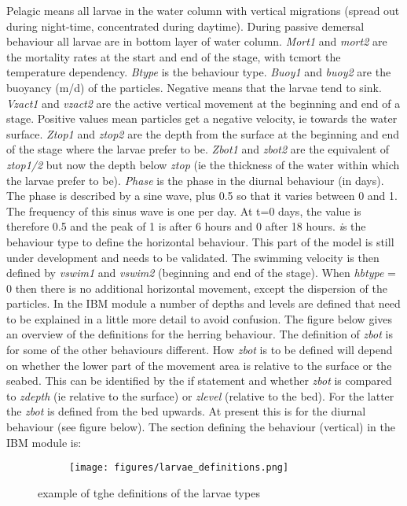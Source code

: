 \documentclass[english]{deltares_manual}
\begin{document}
Pelagic means all larvae in the water column with vertical migrations (spread out during night-time, concentrated during daytime). During passive demersal behaviour all larvae are in bottom layer of water column. 
\textit{Mort1} and \textit{mort2} are the mortality rates at the start and end of the stage, with tcmort the temperature dependency. \textit{Btype} is the behaviour type. 
\textit{Buoy1} and \textit{buoy2} are the buoyancy (m/d) of the particles. Negative means that the larvae tend to sink. \textit{Vzact1} and \textit{vzact2} are the active vertical movement at the beginning and end of a stage. Positive values mean particles get a negative velocity, ie towards the water surface. 
\textit{Ztop1} and \textit{ztop2} are the depth from the surface at the beginning and end of the stage where the larvae prefer to be. \textit{Zbot1} and \textit{zbot2} are the equivalent of \textit{ztop1/2} but now the depth below \textit{ztop} (ie the thickness of the water within which the larvae prefer to be). 
\textit{Phase} is the phase in the diurnal behaviour (in days). The phase is described by a sine wave, plus 0.5 so that it varies between 0 and 1. The frequency of this sinus wave is one per day. At t=0 days, the value is therefore 0.5 and the peak of 1 is after 6 hours and 0 after 18 hours.
\textit\textit is the behaviour type to define the horizontal behaviour. This part of the model is still under development and needs to be validated. The swimming velocity is then defined by \textit{vswim1} and \textit{vswim2} (beginning and end of the stage). When \textit{hbtype} = 0 then there is no additional horizontal movement, except the dispersion of the particles.
In the IBM module a number of depths and levels are defined that need to be explained in a little more detail to avoid confusion. The figure below gives an overview of the definitions for the herring behaviour. The definition of \textit{zbot} is for some of the other behaviours different. How \textit{zbot} is to be defined will depend on whether the lower part of the movement area is relative to the surface or the seabed. This can be identified by the if statement and whether \textit{zbot} is compared to \textit{zdepth} (ie relative to the surface) or \textit{zlevel} (relative to the bed). For the latter the \textit{zbot} is defined from the bed upwards. At present this is for the diurnal behaviour (see figure below). The section defining the behaviour (vertical) in the IBM module is: 
\begin{figure}[H]%
	\begin{tcolorbox}[interior hidden, 
		boxsep=0pt,
		left=0pt,
		right=0pt,
		top=0pt,]
		\begin{subfigure}{1.0\textwidth}
			\texttt{[image: figures/larvae\_definitions.png]}%
		\end{subfigure}
	\end{tcolorbox}
	\caption{example of tghe definitions of the larvae types}
	\label{fig:larvae_definitions}
\end{figure}
\end{document}
